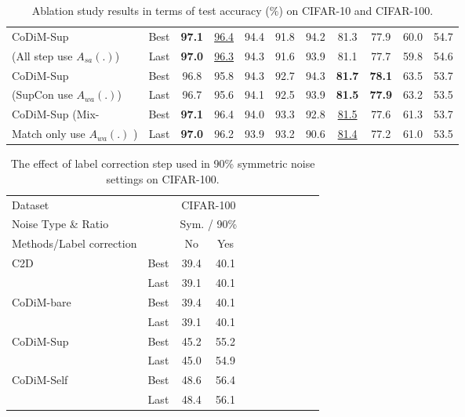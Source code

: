 \documentclass[letterpaper]{article} \usepackage{aaai22}  \usepackage{times}  \usepackage{helvet}  \usepackage{courier}  \usepackage[hyphens]{url}  \usepackage{graphicx} \usepackage{subfigure}
\begin{document}
\begin{table*}[ht]
\begin{center}
\begin{tabular}{lcccccccccc}
CoDiM-Sup & Best & \textbf{97.1} & \underline{96.4} & 94.4 & 91.8 & 94.2 & 81.3 & 77.9 & 60.0 & 54.7 \\
(All step use $A_{sa}(.)$)& Last & \textbf{97.0} & \underline{96.3} & 94.3 & 91.6 & 93.9 & 81.1 & 77.7 & 59.8 & 54.6 \\
\hline
CoDiM-Sup & Best & 96.8 & 95.8 & 94.3 & 92.7 & 94.3 & \textbf{81.7} & \textbf{78.1} & 63.5 & 53.7 \\
(SupCon use $A_{wa}(.)$) & Last & 96.7 & 95.6 & 94.1 & 92.5 & 93.9 & \textbf{81.5} & \textbf{77.9} & 63.2 & 53.5 \\
\hline
CoDiM-Sup (Mix-& Best & \textbf{97.1} & 96.4 & 94.0 & 93.3 & 92.8 & \underline{81.5} & 77.6 & 61.3 & 53.7 \\
Match only use $A_{wa}(.)$ )& Last & \textbf{97.0} & 96.2 & 93.9 & 93.2 & 90.6 & \underline{81.4} & 77.2 & 61.0 & 53.5 \\
\hline
\end{tabular}
\end{center}
\caption{Ablation study results in terms of test accuracy ($\%$) on CIFAR-10 and CIFAR-100.}
\label{tab:tableC1}
\end{table*}


\begin{table}[ht]
\begin{center}
\begin{tabular}{lcccccccccc}
\hline
Dataset & & \multicolumn{2}{c}{CIFAR-100} \\
Noise Type \& Ratio & & \multicolumn{2}{c}{Sym. / 90\%}\\
\hline
Methods/Label correction& & No &Yes \\
\hline
\multirow{2}{*}{C2D} & Best & 39.4 & 40.1 \\
& Last & 39.1 & 40.1 \\
\hline
\multirow{2}{*}{CoDiM-bare} & Best & 39.4 & 40.1 \\
& Last & 39.1 & 40.1 \\
\hline
\multirow{2}{*}{CoDiM-Sup} & Best & 45.2 & 55.2 \\
& Last & 45.0 & 54.9 \\
\hline
\multirow{2}{*}{CoDiM-Self} & Best & 48.6 & 56.4 \\
& Last & 48.4 & 56.1 \\
\hline
\end{tabular}
\end{center}
\caption{The effect of label correction step used in 90\% symmetric noise settings on CIFAR-100. }
\label{tab:table7_app}
\end{table}
\end{document}
